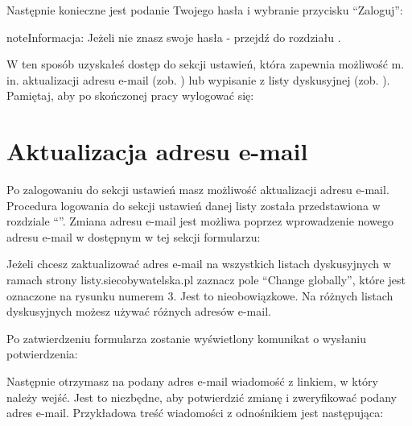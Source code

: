 \documentclass[letterpaper,10pt,polish]{sphinxmanual}
\begin{document}
\noindent{}

Następnie konieczne jest podanie Twojego hasła i wybranie przycisku ``Zaloguj'':

\noindent{}

\begin{notice}{note}{Informacja:}
Jeżeli nie znasz swoje hasła - przejdź do rozdziału {\hyperref[users:przypomnienie\string-hasla]{}}.
\end{notice}

W ten sposób uzyskałeś dostęp do sekcji ustawień, która zapewnia możliwość m. in. aktualizacji adresu e-mail (zob. {\hyperref[users:aktualizacja\string-adresu\string-e\string-mail]{}}) lub wypisanie z listy dyskusyjnej (zob. {\hyperref[users:wypisanie\string-z\string-listy\string-dyskusyjnej]{}}). Pamiętaj, aby po skończonej pracy wylogować się:

\noindent{}


\section{Aktualizacja adresu e-mail}
\label{users:aktualizacja-adresu-e-mail}
Po zalogowaniu do sekcji ustawień masz możliwość aktualizacji adresu e-mail. Procedura logowania do sekcji ustawień danej listy została przedstawiona w rozdziale ``{\hyperref[users:ustawienia]{}}''. Zmiana adresu e-mail jest możliwa poprzez wprowadzenie nowego adresu e-mail w dostępnym w tej sekcji formularzu:

\noindent{}

Jeżeli chcesz zaktualizować adres e-mail na wszystkich listach dyskusyjnych w ramach strony listy.siecobywatelska.pl zaznacz pole ``Change globally'', które jest oznaczone na rysunku numerem 3. Jest to nieobowiązkowe. Na różnych listach dyskusyjnych możesz używać różnych adresów e-mail.

Po zatwierdzeniu formularza zostanie wyświetlony komunikat o wysłaniu potwierdzenia:

\noindent{}

Następnie otrzymasz na podany adres e-mail wiadomość z linkiem, w który należy wejść. Jest to niezbędne, aby potwierdzić zmianę i zweryfikować podany adres e-mail. Przykładowa treść wiadomości z odnośnikiem jest następująca:
\end{document}

